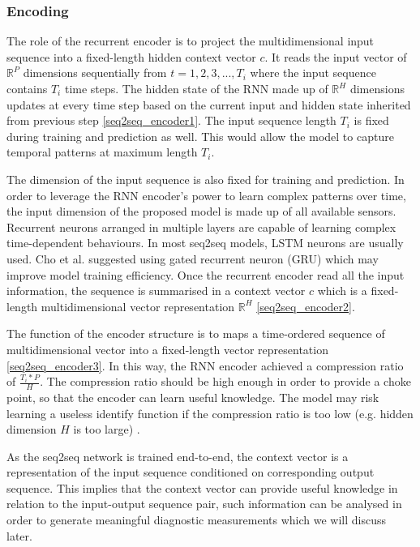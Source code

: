 \documentclass[11pt]{article} %
\theoremstyle{plain}
\theoremstyle{definition}
\begin{document}
\subsubsection{Encoding} The role of the recurrent encoder is to project the multidimensional input sequence into a fixed-length hidden context vector \(c\). It reads the input vector of \(\mathbb{R}^P\) dimensions sequentially from \(t=1,2,3,...,T_i\) where the input sequence contains \(T_i\) time steps. The hidden state of the RNN made up of \(\mathbb{R}^H\) dimensions updates at every time step based on the current input and hidden state inherited from previous step \eqref{seq2seq_encoder1}. The input sequence length \(T_i\) is fixed during training and prediction as well. This would allow the model to capture temporal patterns at maximum length \(T_i\).

The dimension of the input sequence is also fixed for training and prediction. In order to leverage the RNN encoder’s power to learn complex patterns over time, the input dimension of the proposed model is made up of all available sensors. Recurrent neurons arranged in multiple layers are capable of learning complex time-dependent behaviours. In most seq2seq models, LSTM neurons are usually used. Cho et al. \cite{cho2014} suggested using gated recurrent neuron (GRU) which may improve model training efficiency. Once the recurrent encoder read all the input information, the sequence is summarised in a context vector \(c\) which is a  fixed-length multidimensional vector representation \(\mathbb{R}^H\) \eqref{seq2seq_encoder2}.

The function of the encoder structure is to maps a time-ordered sequence of multidimensional vector into a fixed-length vector representation \eqref{seq2seq_encoder3}. In this way, the RNN encoder achieved a compression ratio of \( \frac{T_i*P}{H} \). The compression ratio should be high enough in order to provide a choke point, so that the encoder can learn useful knowledge. The model may risk learning a useless identify function if the compression ratio is too low (e.g. hidden dimension \(H\) is too large) \cite{goodfellow}.

As the seq2seq network is trained end-to-end, the context vector is a representation of the input sequence conditioned on corresponding output sequence. This implies that the context vector can provide useful knowledge in relation to the input-output sequence pair, such information can be analysed in order to generate meaningful diagnostic measurements which we will discuss later.
\end{document}

